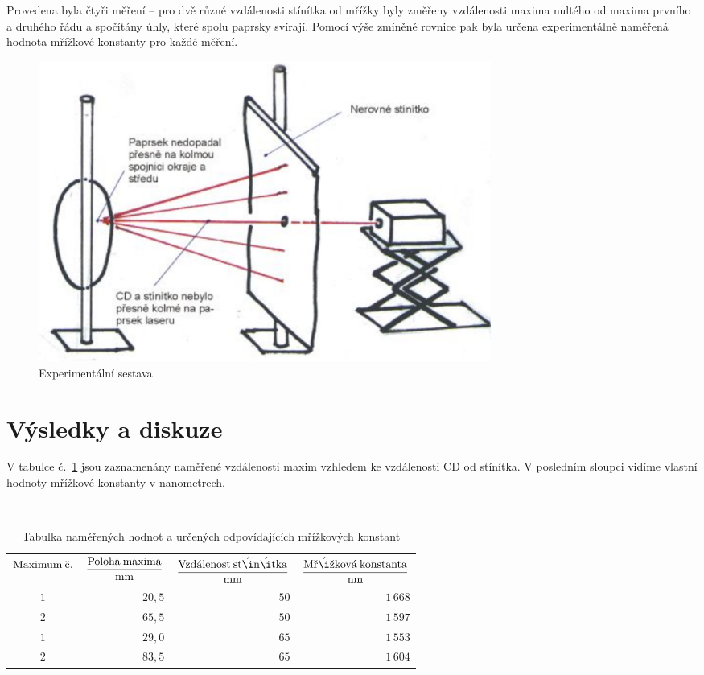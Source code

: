 \documentclass[12pt,a4paper]{article}
\begin{document}
Provedena byla  čtyři měření -- pro dvě různé
vzdálenosti stínítka od mřížky byly změřeny vzdálenosti maxima nultého od
maxima prvního a druhého řádu a spočítány úhly, které spolu paprsky svírají.
Pomocí výše zmíněné rovnice pak byla určena experimentálně naměřená hodnota mřížkové konstanty
pro každé měření.

\begin{figure}[h]
\centering
\includegraphics[width=0.72\textwidth]{Image4}
\caption{Experimentální sestava}
\end{figure} \label{fig3}


\section{Výsledky a diskuze}
V tabulce č.~\ref{tab:namerene} jsou zaznamenány naměřené vzdálenosti maxim vzhledem 
ke vzdálenosti CD od stínítka. V posledním sloupci vidíme
vlastní hodnoty mřížkové konstanty v nanometrech.

\begin{table}
\begin{center}
\caption{\label{tab:namerene}Tabulka naměřených hodnot a určených odpovídajících mřížkových konstant}~\\
\begin{tabular}{|c|r|r|r|}\hline
\rule[-3ex]{0pt}{7.5ex}	 {\sf $\rm Maximum\:\check{c}.$}
	&{\sf $\dfrac{\rm Poloha\:maxima}{\rm mm}$}
	&{\sf $\dfrac{\rm Vzd\acute{a}lenost\:st\acute{ı}n\acute{ı}tka}{\rm mm}$}
	&{\sf $\dfrac{\rm M\check{r}\acute{ı}\check{z}kov\acute{a}\:konstanta}{\rm nm}$}
\\\hline
	 {\sf $1$}
	&{\sf $20,\!5$}
	&{\sf $50$}
	&{\sf $1\,668$}
\\\hline
	 {\sf $2$}
	&{\sf $65,\!5$}
	&{\sf $50$}
	&{\sf $1\,597$}
\\\hline
	 {\sf $1$}
	&{\sf $29,\!0$}
	&{\sf $65$}
	&{\sf $1\,553$}
\\\hline
	 {\sf $2$}
	&{\sf $83,\!5$}
	&{\sf $65$}
	&{\sf $1\,604$}
\\\hline
\end{tabular}
\end{center}
\end{table}
\end{document}
